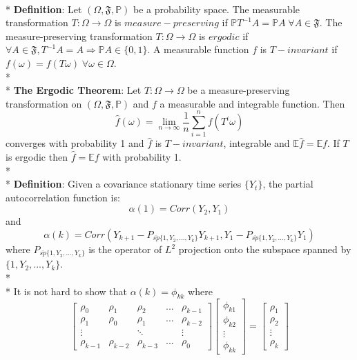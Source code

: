 \documentclass[11pt]{article}
\begin{document}
\\*
{\bf Definition}: Let $\left( \Omega, \mathfrak{F}, \mathbb{P} \right)$ be a probability space. The measurable transformation $T: \Omega \rightarrow \Omega$ is $measure-preserving$ if $\mathbb{P}T^{-1}A = \mathbb{P}A \; \forall A \in \mathfrak{F}$. The measure-preserving transformation $T: \Omega \rightarrow \Omega$ is $ergodic$ if $\forall A \in \mathfrak{F}, T^{-1}A = A \Rightarrow \mathbb{P}A \in \{ 0, 1 \}$. A measurable function $f$ is $T-invariant$ if $f\left(\omega \right) = f \left( T \omega \right) \; \forall \omega \in \Omega$.
\\*
\\*
{\bf The Ergodic Theorem}: Let $T: \Omega \rightarrow \Omega$ be a measure-preserving transformation on $\left( \Omega, \mathfrak{F}, \mathbb{P} \right)$ and $f$ a measurable and integrable function. Then
\begin{equation}
\widehat{f} \left( \omega \right) = \lim_{n \rightarrow \infty} \frac{1}{n} \sum_{i=1}^n f \left( T^i \omega \right)
\end{equation}
converges with probability 1 and $\widehat{f}$ is $T-invariant$, integrable and $\mathbb{E}\widehat{f} = \mathbb{E}f$. If $T$ is ergodic then $\widehat{f} = \mathbb{E}f$ with probability 1.
\\*
\\*
{\bf Definition}: Given a covariance stationary time series $\{Y_t\}$, the partial autocorrelation function is:
\begin{equation}
\alpha \left( 1 \right) = Corr \left(Y_2 , Y_1 \right)
\end{equation}
and
\begin{equation}
\alpha \left(k\right) = Corr \left( Y_{k+1} - P_{\overline{sp} \{1,Y_2,...,Y_k\}} Y_{k+1} , Y_{1} - P_{\overline{sp} \{1,Y_2,...,Y_k\}} Y_1 \right)
\end{equation}
where $P_{\overline{sp} \{1,Y_2,...,Y_k\}}$ is the operator of $L^2$ projection onto the subspace spanned by $\{1,Y_2,...,Y_k\}$.
\\*
\\*
It is not hard to show that $\alpha \left( k \right) = \phi_{kk}$ where
\begin{equation}
\left[
\begin{matrix}
\rho_0 & \rho_1 & \rho_2 & ... & \rho_{k-1} \\
\rho_1 & \rho_0 & \rho_1 & ... & \rho_{k-2} \\
\vdots & & \ddots & & \vdots \\
\rho_{k-1} & \rho_{k-2} & \rho_{k-3} & ... & \rho_0 
\end{matrix}
\right]
\left[
\begin{matrix}
\phi_{k1} \\
\phi_{k2} \\
\vdots \\
\phi_{kk}
\end{matrix}
\right]
=
\left[
\begin{matrix}
\rho_1 \\
\rho_2 \\
\vdots \\
\rho_k
\end{matrix}
\right]
\end{equation}
\end{document}
